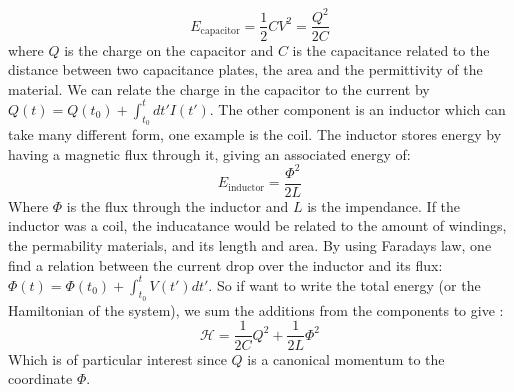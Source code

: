 \begin{equation}
    E_{\text{capacitor}} = \frac{1}{2} CV^2 = \frac{Q^2}{2C}
\end{equation}
where $Q$ is the charge on the capacitor and $C$ is the capacitance related to the distance between two capacitance plates, the area and the permittivity of the material. We can relate the charge in the capacitor to the current by $Q(t) = Q(t_0) + \int_{t_0}^{t} dt' I(t')$. The other component is an inductor which can take many different form, one example is the coil. The inductor stores energy by having a magnetic flux through it, giving an associated energy of:
\begin{equation}
    E_{\text{inductor}} = \frac{\Phi^2}{2 L}
\end{equation}
Where $\Phi$ is the flux through the inductor and $L$ is the impendance. If the inductor was a coil, the inducatance would be related to the amount of windings, the permability materials, and its length and area. By using Faradays law, one find a relation between the current drop over the inductor and its flux: $\Phi(t) = \Phi(t_0) + \int_{t_0}^t V(t')dt'$. So if want to write the total energy (or the Hamiltonian of the system), we sum the additions from the components to give \cite{blais_circuit_2021}:
\begin{equation}
    \mathcal{H} = \frac{1}{2C} Q^2 + \frac{1}{2L} \Phi^2
\end{equation}
Which is of particular interest since $Q$ is a canonical momentum to the coordinate $\Phi$. 




